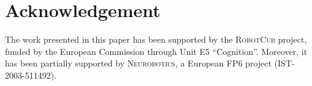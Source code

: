 \section*{Acknowledgement}
The work presented in this paper
has been supported by the \textsc{RobotCub} project, funded by the
European Commission through Unit E5 ``Cognition''. Moreover, it has
been partially supported by \textsc{Neurobotics}, a European FP6 
project (IST-2003-511492).



